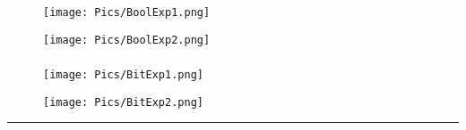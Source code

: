 \documentclass[12pt,letterpaper]{article}
\begin{document}
\newpage
\subsubsection*{}
\begin{figure}[h]
    \centering
    \texttt{[image: Pics/BoolExp1.png]}
\end{figure}
\begin{figure}[h]
    \centering
    \texttt{[image: Pics/BoolExp2.png]}
\end{figure}

\newpage
\subsubsection*{}
\begin{figure}[h]
    \centering
    \texttt{[image: Pics/BitExp1.png]}
\end{figure}
\begin{figure}[h]
    \centering
    \texttt{[image: Pics/BitExp2.png]}
\end{figure}
\hrule
\end{document}

